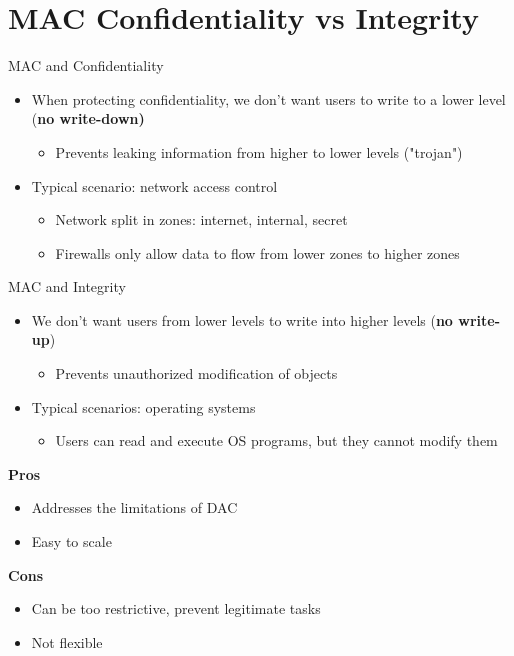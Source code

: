 \documentclass[11pt]{article}
\begin{document}
\section*{MAC Confidentiality vs Integrity}

MAC and Confidentiality
\begin{itemize}
	\item When protecting confidentiality, we don't want users to write to a lower level (\textbf{no write-down)}
		\begin{itemize}
			\item Prevents leaking information from higher to lower levels ("trojan")
		\end{itemize}
	\item Typical scenario: network access control
		\begin{itemize}
			\item Network split in zones: internet, internal, secret
			\item Firewalls only allow data to flow from lower zones to higher zones
		\end{itemize}
\end{itemize}

MAC and Integrity

\begin{itemize}
	\item We don't want users from lower levels to write into higher levels (\textbf{no write-up})
		\begin{itemize}
			\item Prevents unauthorized modification of objects
		\end{itemize}
	\item Typical scenarios: operating systems
		\begin{itemize}
			\item Users can read and execute OS programs, but they cannot modify them
		\end{itemize}
\end{itemize}


\begin{minipage}{0.5\textwidth}
\textbf{Pros}
\begin{itemize}
	\item Addresses the limitations of DAC
	\item Easy to scale
\end{itemize}

\end{minipage}
\begin{minipage}{0.5\textwidth}
\textbf{Cons}
\begin{itemize}
	\item Can be too restrictive, prevent legitimate tasks
	\item Not flexible
\end{itemize}

\end{minipage}
\end{document}
